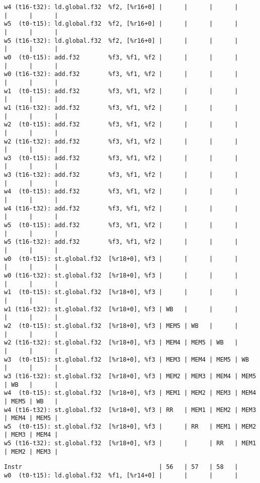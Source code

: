 \documentclass[11pt]{article}
\begin{document}
\begin{Answer}
\begin{verbatim}
w4 (t16-t32): ld.global.f32  %f2, [%r16+0] |      |      |      |      |      |      |
w5  (t0-t15): ld.global.f32  %f2, [%r16+0] |      |      |      |      |      |      |
w5 (t16-t32): ld.global.f32  %f2, [%r16+0] |      |      |      |      |      |      |
w0  (t0-t15): add.f32        %f3, %f1, %f2 |      |      |      |      |      |      |
w0 (t16-t32): add.f32        %f3, %f1, %f2 |      |      |      |      |      |      |
w1  (t0-t15): add.f32        %f3, %f1, %f2 |      |      |      |      |      |      |
w1 (t16-t32): add.f32        %f3, %f1, %f2 |      |      |      |      |      |      |
w2  (t0-t15): add.f32        %f3, %f1, %f2 |      |      |      |      |      |      |
w2 (t16-t32): add.f32        %f3, %f1, %f2 |      |      |      |      |      |      |
w3  (t0-t15): add.f32        %f3, %f1, %f2 |      |      |      |      |      |      |
w3 (t16-t32): add.f32        %f3, %f1, %f2 |      |      |      |      |      |      |
w4  (t0-t15): add.f32        %f3, %f1, %f2 |      |      |      |      |      |      |
w4 (t16-t32): add.f32        %f3, %f1, %f2 |      |      |      |      |      |      |
w5  (t0-t15): add.f32        %f3, %f1, %f2 |      |      |      |      |      |      |
w5 (t16-t32): add.f32        %f3, %f1, %f2 |      |      |      |      |      |      |
w0  (t0-t15): st.global.f32  [%r18+0], %f3 |      |      |      |      |      |      |
w0 (t16-t32): st.global.f32  [%r18+0], %f3 |      |      |      |      |      |      |
w1  (t0-t15): st.global.f32  [%r18+0], %f3 |      |      |      |      |      |      |
w1 (t16-t32): st.global.f32  [%r18+0], %f3 | WB   |      |      |      |      |      |
w2  (t0-t15): st.global.f32  [%r18+0], %f3 | MEM5 | WB   |      |      |      |      |
w2 (t16-t32): st.global.f32  [%r18+0], %f3 | MEM4 | MEM5 | WB   |      |      |      |
w3  (t0-t15): st.global.f32  [%r18+0], %f3 | MEM3 | MEM4 | MEM5 | WB   |      |      |
w3 (t16-t32): st.global.f32  [%r18+0], %f3 | MEM2 | MEM3 | MEM4 | MEM5 | WB   |      |
w4  (t0-t15): st.global.f32  [%r18+0], %f3 | MEM1 | MEM2 | MEM3 | MEM4 | MEM5 | WB   |
w4 (t16-t32): st.global.f32  [%r18+0], %f3 | RR   | MEM1 | MEM2 | MEM3 | MEM4 | MEM5 |
w5  (t0-t15): st.global.f32  [%r18+0], %f3 |      | RR   | MEM1 | MEM2 | MEM3 | MEM4 |
w5 (t16-t32): st.global.f32  [%r18+0], %f3 |      |      | RR   | MEM1 | MEM2 | MEM3 |
\end{verbatim}
	\newpage
	\begin{verbatim}
Instr                                      | 56   | 57   | 58   |
w0  (t0-t15): ld.global.f32  %f1, [%r14+0] |      |      |      | 

\end{verbatim}
\end{Answer}
\end{document}
